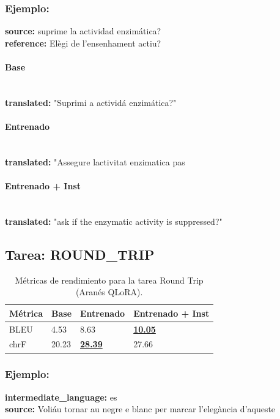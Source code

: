 \subsubsection{Ejemplo:}
\textbf{source:} suprime la actividad enzimática?\\
\textbf{reference:} Elègi de l’ensenhament actiu?

\paragraph{Base}~\\
\textbf{translated:} "Suprimi a actividá enzimática?"

\paragraph{Entrenado}~\\
\textbf{translated:} "Assegure l\textquotesingle{}activitat enzimatica pas

\paragraph{Entrenado + Inst}~\\
\textbf{translated:} "ask if the enzymatic activity is suppressed?"

\subsection{Tarea: ROUND\_TRIP}\label{tarea-round_trip}
\begin{longtable}[]{@{}llll@{}}
\toprule\noalign{}
Métrica & Base & Entrenado & Entrenado + Inst \\
\midrule\noalign{}
\endhead
\bottomrule\noalign{}
\caption{Métricas de rendimiento para la tarea Round Trip (Aranés QLoRA).}
\label{tab:metricas_round_trip_Aranés QLoRA}
\endlastfoot
BLEU & 4.53 & 8.63 & \textbf{\underline{10.05}} \\
chrF & 20.23 & \textbf{\underline{28.39}} & 27.66 \\
\end{longtable}

\subsubsection{Ejemplo:}
\textbf{intermediate\_language:} es\\
\textbf{source:} Voliáu tornar au negre e blanc per marcar l’elegància d’aqueste

